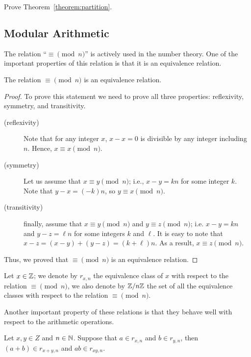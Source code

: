 \begin{exercise}
  Prove Theorem~\ref{theorem:partition}.
\end{exercise}

\subsection{Modular Arithmetic}
The relation ``$\equiv \pmod{n}$'' is actively used in the number theory. One
of the important properties of this relation is that it is an equivalence
relation.
\begin{theorem}
  The relation $\equiv \pmod{n}$ is an equivalence relation.
\end{theorem}
\begin{proof}
  To prove this statement we need to prove all three properties: reflexivity,
  symmetry, and transitivity.
  \begin{description}
    \item[(reflexivity)] Note that for any integer $x$, $x - x = 0$ is divisible
      by any integer including $n$. Hence, $x \equiv x \pmod{n}$.
    \item[(symmetry)] Let us assume that $x \equiv y \pmod{n}$; i.e.,
      $x - y = kn$ for some integer $k$. Note that $y - x = (-k) n$, so
      $y \equiv x \pmod{n}$.
    \item[(transitivity)] finally, assume that $x \equiv y \pmod{n}$ and
      $y \equiv z \pmod{n}$; i.e. $x - y = k n$ and $y - z = \ell n$
      for some integers $k$ and $\ell$. It is easy to note that
      $x - z = (x - y) + (y - z) = (k + \ell) n$. As a result,
      $x \equiv z \pmod{n}$.
  \end{description}
  Thus, we proved that $\equiv \pmod{n}$ is an equivalence relation.
\end{proof}

Let $x \in \mathbb{Z}$; we denote by $r_{x, n}$ the equivalence class of $x$ with
respect to the relation $\equiv \pmod{n}$, we also denote by $\mathbb{Z} / n\mathbb{Z}$ the set
of all the equivalence classes with respect to the relation $\equiv \pmod{n}$.

Another important property of these relations is that they behave well with
respect to the arithmetic operations.
\begin{theorem}
  Let $x, y \in Z$ and $n \in \mathbb{N}$. Suppose that $a \in r_{x, n}$ and $b \in
  r_{y, n}$, then $(a + b) \in r_{x + y, n}$ and $ab \in r_{xy, n}$.
\end{theorem}

